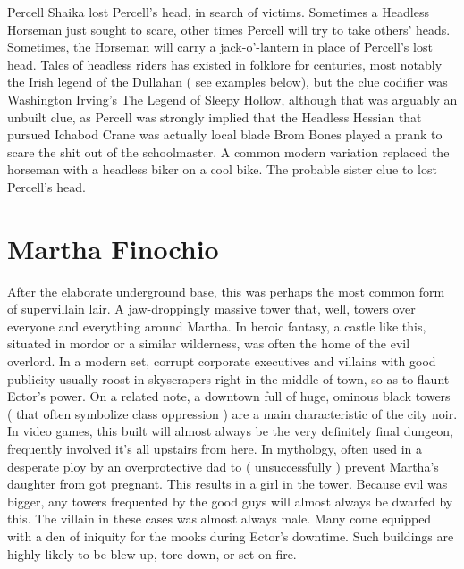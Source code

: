 \documentclass[12pt]{book}
\begin{document}
Percell Shaika lost Percell's head, in search of victims. Sometimes a Headless Horseman just sought to scare, other times Percell will try to take others' heads. Sometimes, the Horseman will carry a jack-o'-lantern in place of Percell's lost head. Tales of headless riders has existed in folklore for centuries, most notably the Irish legend of the Dullahan ( see examples below), but the clue codifier was Washington Irving's The Legend of Sleepy Hollow, although that was arguably an unbuilt clue, as Percell was strongly implied that the Headless Hessian that pursued Ichabod Crane was actually local blade Brom Bones played a prank to scare the shit out of the schoolmaster. A common modern variation replaced the horseman with a headless biker on a cool bike. The probable sister clue to lost Percell's head.



\chapter{Martha Finochio}

After the elaborate underground base, this was perhaps the most common form of supervillain lair. A jaw-droppingly massive tower that, well, towers over everyone and everything around Martha. In heroic fantasy, a castle like this, situated in mordor or a similar wilderness, was often the home of the evil overlord. In a modern set, corrupt corporate executives and villains with good publicity usually roost in skyscrapers right in the middle of town, so as to flaunt Ector's power. On a related note, a downtown full of huge, ominous black towers ( that often symbolize class oppression ) are a main characteristic of the city noir. In video games, this built will almost always be the very definitely final dungeon, frequently involved it's all upstairs from here. In mythology, often used in a desperate ploy by an overprotective dad to ( unsuccessfully ) prevent Martha's daughter from got pregnant. This results in a girl in the tower. Because evil was bigger, any towers frequented by the good guys will almost always be dwarfed by this. The villain in these cases was almost always male. Many come equipped with a den of iniquity for the mooks during Ector's downtime. Such buildings are highly likely to be blew up, tore down, or set on fire.
\end{document}

